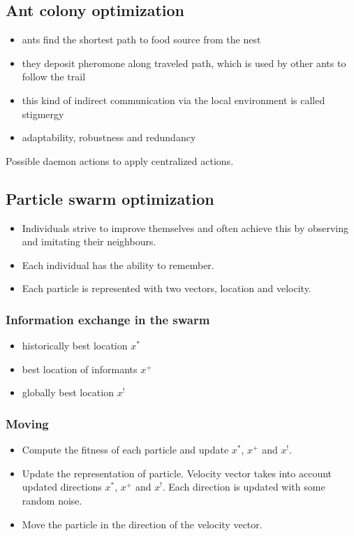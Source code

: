 \begin{multicols}{5}
\subsection{Ant colony optimization}
\begin{itemize}
	\item ants find the shortest path to food source from the nest
	\item they deposit pheromone along traveled path, which is used by other ants to follow the trail
	\item this kind of indirect communication via the local environment is called stigmergy
	\item adaptability, robustness and redundancy
\end{itemize}
Possible daemon actions to apply centralized actions.
\subsection{Particle swarm optimization}
\begin{itemize}
	\item Individuals strive to improve themselves and often achieve this by observing and imitating their neighbours.
	\item Each individual has the ability to remember.
	\item Each particle is represented with two vectors, location and velocity.
\end{itemize}
\subsubsection{Information exchange in the swarm}
\begin{itemize}
	\item historically best location $x^*$
	\item best location of informants $x^+$
	\item globally best location $x^!$
\end{itemize}
\subsubsection{Moving}
\begin{itemize}
	\item Compute the fitness of each particle and update $x^*$, $x^+$ and $x^!$.
	\item Update the representation of particle.
		Velocity vector takes into account updated directions $x^*$, $x^+$ and $x^!$.
		Each direction is updated with some random noise.
	\item Move the particle in the direction of the velocity vector.
\end{itemize}


\end{multicols}

